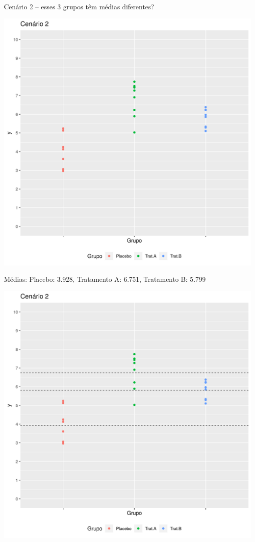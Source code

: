\documentclass{beamer}
\begin{document}
\begin{frame}[label=cenario2]{\small Cenário 2 -- esses 3 grupos têm médias diferentes?}
  \begin{center}
    \includegraphics[height=.9\textheight]{Cap13-30/cenario2}
  \end{center}
\end{frame}

\begin{frame}{\footnotesize Médias: Placebo: 3.928, Tratamento A: 6.751, Tratamento B: 5.799}
  \begin{center}
    \includegraphics[height=.9\textheight]{Cap13-30/cenario2_medias}

  \end{center}
\end{frame}
\end{document}
